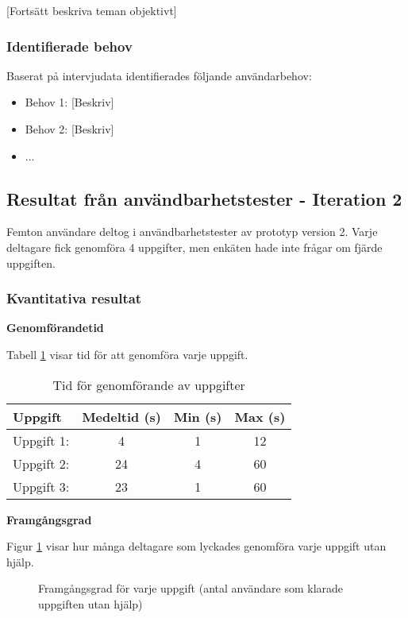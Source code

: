 [Fortsätt beskriva teman objektivt]


\subsubsection{Identifierade behov}

Baserat på intervjudata identifierades följande användarbehov:
\begin{itemize}
    \item Behov 1: [Beskriv]
    \item Behov 2: [Beskriv]
    \item ...
\end{itemize}


\subsection{Resultat från användbarhetstester - Iteration 2}

Femton användare deltog i användbarhetstester av prototyp version 2. Varje deltagare fick genomföra 4 uppgifter, men enkäten hade inte frågar om fjärde uppgiften. 


\subsubsection{Kvantitativa resultat}

\textbf{Genomförandetid}

Tabell \ref{tab:tid} visar tid för att genomföra varje uppgift.

\begin{table}[h]
\centering
\begin{tabular}{|l|c|c|c|}
\hline
\textbf{Uppgift} & \textbf{Medeltid (s)} & \textbf{Min (s)} & \textbf{Max (s)} \\
\hline
Uppgift 1:  & 4 & 1 & 12 \\
Uppgift 2:  & 24 & 4 & 60\\
Uppgift 3:  & 23 & 1 & 60\\
\hline
\end{tabular}
\caption{Tid för genomförande av uppgifter}
\label{tab:tid}
\end{table}

\textbf{Framgångsgrad}

Figur \ref{fig:success_rate} visar hur många deltagare som lyckades genomföra varje uppgift utan hjälp.

\begin{figure}[h]
    \centering
    \caption{Framgångsgrad för varje uppgift (antal användare som klarade uppgiften utan hjälp)}
    \label{fig:success_rate}
\end{figure}

